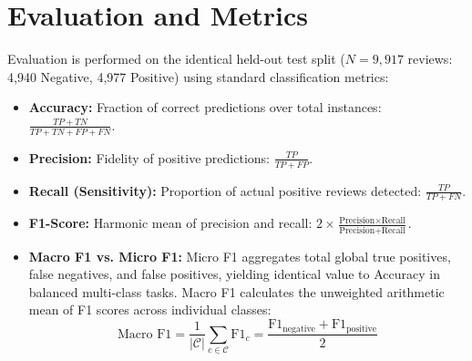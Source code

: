 \section{Evaluation and Metrics}
Evaluation is performed on the identical held-out test split ($N = 9,917$ reviews: 4,940 Negative, 4,977 Positive) using standard classification metrics:
\begin{itemize}
    \item \textbf{Accuracy:} Fraction of correct predictions over total instances: $\frac{TP + TN}{TP + TN + FP + FN}$.
    \item \textbf{Precision:} Fidelity of positive predictions: $\frac{TP}{TP + FP}$.
    \item \textbf{Recall (Sensitivity):} Proportion of actual positive reviews detected: $\frac{TP}{TP + FN}$.
    \item \textbf{F1-Score:} Harmonic mean of precision and recall: $2 \times \frac{\text{Precision} \times \text{Recall}}{\text{Precision} + \text{Recall}}$.
    \item \textbf{Macro F1 vs. Micro F1:} Micro F1 aggregates total global true positives, false negatives, and false positives, yielding identical value to Accuracy in balanced multi-class tasks. Macro F1 calculates the unweighted arithmetic mean of F1 scores across individual classes:
    \begin{equation}
        \text{Macro F1} = \frac{1}{|\mathcal{C}|} \sum_{c \in \mathcal{C}} \text{F1}_c = \frac{\text{F1}_{\text{negative}} + \text{F1}_{\text{positive}}}{2}
    \end{equation}
\end{itemize}

